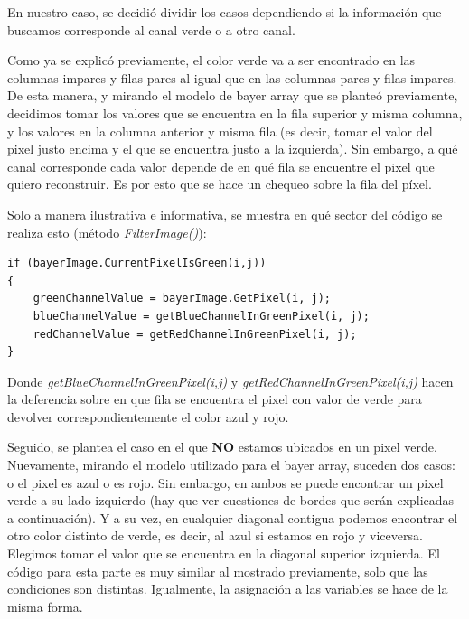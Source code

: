 En nuestro caso, se decidió dividir los casos dependiendo si la información que buscamos corresponde al canal verde o a otro canal.

\vspace{\baselineskip}

Como ya se explicó previamente, el color verde va a ser encontrado en las columnas impares y filas pares al igual que en las columnas pares y filas impares. De esta manera, y mirando el modelo de bayer array que se planteó previamente, decidimos tomar los valores que se encuentra en la fila superior y misma columna, y los valores en la columna anterior y misma fila (es decir, tomar el valor del pixel justo encima y el que se encuentra justo a la izquierda). Sin embargo, a qué canal corresponde cada valor depende de en qué fila se encuentre el pixel que quiero reconstruir. Es por esto que se hace un chequeo sobre la fila del píxel.

\vspace{\baselineskip}

Solo a manera ilustrativa e informativa, se muestra en qué sector del código se realiza esto (método \textit{FilterImage()}): 

\vspace{\baselineskip}

\begin{lstlisting}
if (bayerImage.CurrentPixelIsGreen(i,j))
{
	greenChannelValue = bayerImage.GetPixel(i, j);
	blueChannelValue = getBlueChannelInGreenPixel(i, j);
	redChannelValue = getRedChannelInGreenPixel(i, j);
}
\end{lstlisting}

\vspace{\baselineskip}

Donde \textit{getBlueChannelInGreenPixel(i,j)} y \textit{getRedChannelInGreenPixel(i,j)} hacen la deferencia sobre en que fila se encuentra el pixel con valor de verde para devolver correspondientemente el color azul y rojo.

\vspace{\baselineskip}

Seguido, se plantea el caso en el que \textbf{NO} estamos ubicados en un pixel verde. Nuevamente, mirando el modelo utilizado para el bayer array, suceden dos casos: o el pixel es azul o es rojo. Sin embargo, en ambos se puede encontrar un pixel verde a su lado izquierdo (hay que ver cuestiones de bordes que serán explicadas a continuación). Y a su vez, en cualquier diagonal contigua podemos encontrar el otro color distinto de verde, es decir, al azul si estamos en rojo y viceversa. Elegimos tomar el valor que se encuentra en la diagonal superior izquierda. El código para esta parte es muy similar al mostrado previamente, solo que las condiciones son distintas. Igualmente, la asignación a las variables se hace de la misma forma.

